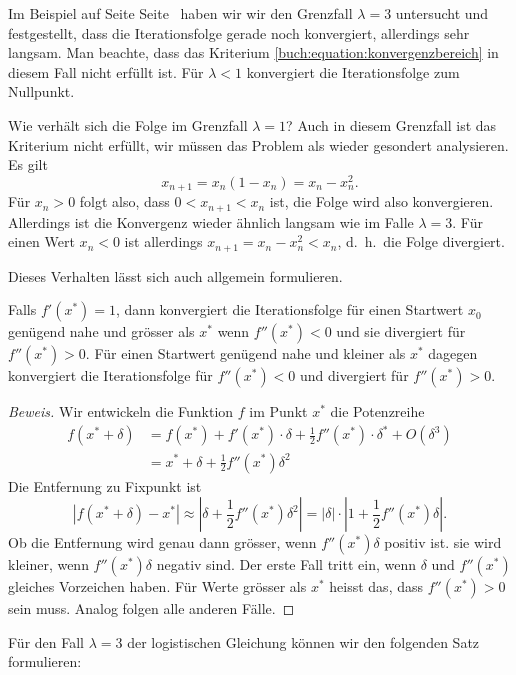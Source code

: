 Im Beispiel auf Seite Seite~\pageref{buch:beispiel:logistisch3} haben wir
wir den Grenzfall $\lambda=3$ untersucht und festgestellt, dass die
Iterationsfolge gerade noch konvergiert, allerdings sehr langsam.
Man beachte, dass das Kriterium \eqref{buch:equation:konvergenzbereich}
in diesem Fall nicht erfüllt ist.
Für $\lambda<1$ konvergiert die Iterationsfolge zum Nullpunkt.

Wie verhält sich die Folge im Grenzfall $\lambda=1$?
Auch in diesem Grenzfall ist das Kriterium nicht erfüllt, wir müssen
das Problem als wieder gesondert analysieren.
Es gilt
\[
x_{n+1} = x_n(1-x_n) = x_n-x_n^2.
\]
Für $x_n>0$ folgt also, dass $0<x_{n+1} < x_n$ ist, die Folge wird also
konvergieren.
Allerdings ist die Konvergenz wieder ähnlich langsam wie im Falle
$\lambda=3$.
Für einen Wert $x_n<0$ ist allerdings $x_{n+1} = x_n - x_n^2 < x_n$,
d.~h.~die Folge divergiert.

Dieses Verhalten lässt sich auch allgemein formulieren.

\begin{satz}
\label{buch:satz:kritischekonvergenz}
Falls $f'(x^*)=1$, dann konvergiert die Iterationsfolge für einen
Startwert $x_0$ genügend nahe und grösser als $x^*$ wenn $f''(x^*)<0$ 
und sie divergiert für $f''(x^*)>0$.
Für einen Startwert genügend nahe und kleiner als $x^*$ dagegen
konvergiert die Iterationsfolge für $f''(x^*)<0$ und divergiert für
$f''(x^*)>0$.
\end{satz}

\begin{proof}[Beweis]
Wir entwickeln die Funktion $f$ im Punkt $x^*$ die Potenzreihe
\begin{align*}
f(x^*+\delta)
&=
f(x^*) + f'(x^*)\cdot\delta + \frac12f''(x^*)\cdot \delta^* + O(\delta^3)
\\
&=
x^* + \delta + \frac12f''(x^*)\delta^2
\end{align*}
Die Entfernung zu Fixpunkt ist
\[
|f(x^*+\delta)-x^*|
\approx
|\delta  + \frac12f''(x^*)\delta^2|
=
|\delta|\cdot |1 + \frac12f''(x^*)\delta|.
\]
Ob die Entfernung wird genau dann grösser, wenn $f''(x^*)\delta$ positiv ist.
sie wird kleiner, wenn $f''(x^*)\delta$ negativ sind.
Der erste Fall tritt ein, wenn $\delta$ und $f''(x^*)$ gleiches
Vorzeichen haben.
Für Werte grösser als $x^*$ heisst das, dass $f''(x^*)>0$ sein muss.
Analog folgen alle anderen Fälle.
\end{proof}

Für den Fall $\lambda=3$ der logistischen Gleichung können wir den
folgenden Satz formulieren:

